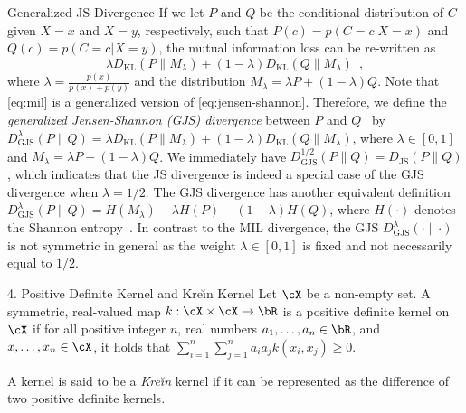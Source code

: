 \documentclass[final]{beamer}
\newcommand{\kr}{Kre\u{\i}n\xspace}
\newcommand{\kl}[2]{D_{\mathrm{KL}}( #1 \parallel #2 )}
\newcommand{\js}[2]{D_{\mathrm{JS}}( #1 \parallel #2 )}
\newcommand{\wjs}[3]{D_{\mathrm{GJS}}^{#1}( #2 \parallel #3 )}
\newlength{\onecolwid}
\begin{document}
\begin{frame}[t]
\begin{columns}[t]
\begin{column}{\onecolwid}
\begin{block}{Generalized JS Divergence}
	 If we let $P$ 
	and 
	$Q$ be the conditional distribution of $C$ given $X=x$ and $X=y$, 
	respectively, 
	such that $ P(c) = p(C=c| X=x) $ and $ Q(c)=p(C=c| X=y) $, the mutual 
	information loss can be re-written as
	\begin{equation}\label{eq:mil}
	\lambda \kl{P}{M_\lambda} + (1-\lambda) \kl{Q}{M_\lambda}\enspace,
	\end{equation}
	where  $\lambda=\frac{p(x)}{p(x)+p(y)}$ and the distribution $ 
	M_\lambda=\lambda P + (1-\lambda)Q $.
	Note that \eqref{eq:mil} is a generalized version of 
	\eqref{eq:jensen-shannon}. 
	Therefore, we define the 
	\emph{generalized Jensen-Shannon (GJS) 
		divergence} between $P$ and 
	$Q$~\citep{lin1991divergence,ali1966general,dhillon2003divisive}
	by
	$
	\wjs{\lambda}{P}{Q} = \lambda \kl{P}{M_\lambda} + (1-\lambda) 
	\kl{Q}{M_\lambda}$,
	where $ \lambda\in [0,1] $ and $ M_\lambda=\lambda P + (1-\lambda)Q $. We 
	immediately have $ \wjs{1/2}{P}{Q} = \js{P}{Q} $, which indicates that the 
	JS divergence is indeed a special case of the GJS divergence when $ 
	\lambda=1/2 $. The GJS
	divergence has 
	another equivalent definition
	$
	\wjs{\lambda}{P}{Q} = H(M_\lambda) - \lambda H(P) - 
	(1-\lambda) H(Q)$,
	where $H(\cdot)$ denotes the Shannon entropy~\cite{cover2012elements}. In 
	contrast to the MIL 
	divergence, the GJS $ \wjs{\lambda}{\cdot}{\cdot} $ is not symmetric in 
	general 
	as the weight $ \lambda\in [0,1] $ is fixed and not necessarily equal to $ 
	1/2 
	$. 
\end{block}	
\vspace{3pt}

\begin{block}{4. Positive Definite Kernel and \kr Kernel}
		Let $ \cX $ be a non-empty set. A symmetric, real-valued map $ 
		k:\cX\times\cX\to \bR $ is a positive definite kernel on $ \cX $ if for 
		all 
		positive integer $ n $, real numbers $ a_1,\dots,a_n\in \bR $, and $ 
		x,\dots,x_n\in \cX $, it holds that $
		\sum_{i=1}^n \sum_{j=1}^n a_i a_j k(x_i,x_j) \ge 0$.
	
	A kernel is said to be a \emph{\kr} kernel if it can be represented as 
	the difference of two positive definite kernels. 
	

\end{block}
\end{column}
\end{columns}
\end{frame}
\end{document}
